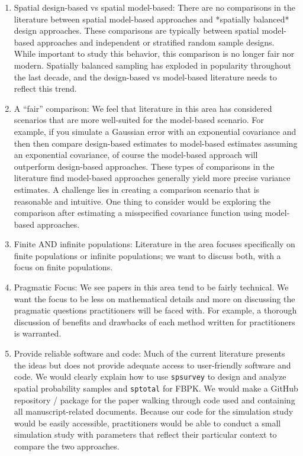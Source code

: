 \begin{enumerate}
  \item Spatial design-based vs spatial model-based: There are no comparisons in the literature between spatial model-based approaches and *spatially balanced* design approaches. These comparisons are typically between spatial model-based approaches and independent or stratified random sample designs. While important to study this behavior, this comparison is no longer fair nor modern. Spatially balanced sampling has exploded in popularity throughout the last decade, and the design-based vs model-based literature needs to reflect this trend.
  \item A ``fair'' comparison: We feel that literature in this area has considered scenarios that are more well-suited for the model-based scenario. For example, if you simulate a Gaussian error with an exponential covariance and then then compare design-based estimates to model-based estimates assuming an exponential covariance, of course the model-based approach will outperform design-based approaches. These types of comparisons in the literature find model-based approaches generally yield more precise variance estimates. A challenge lies in creating a comparison scenario that is reasonable and intuitive. One thing to consider would be exploring the comparison after estimating a misspecified covariance function using model-based approaches. 
  \item Finite AND infinite populations: Literature in the area focuses specifically on finite populations or infinite populations; we want to discuss both, with a focus on finite populations.
  \item Pragmatic Focus: We see papers in this area tend to be fairly technical. We want the focus to be less on mathematical details and more on discussing the pragmatic questions practitioners will be faced with. For example, a thorough discussion of benefits and drawbacks of each method written for practitioners is warranted.
  \item Provide reliable software and code: Much of the current literature presents the ideas but does not provide adequate access to user-friendly software and code. We would clearly explain how to use \texttt{spsurvey} to design and analyze spatial probability samples and \texttt{sptotal} for FBPK. We would make a GitHub repository / package for the paper walking through code used and containing all manuscript-related documents. Because our code for the simulation study would be easily accessible, practitioners would be able to conduct a small simulation study with parameters that reflect their particular context to compare the two approaches.

\end{enumerate}

